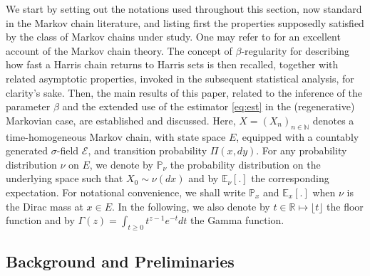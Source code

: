 \documentclass[sn-mathphys-ay]{sn-jnl}%
\begin{document}
We start by setting out the notations used throughout this section, now standard in the
Markov chain literature, and listing first the properties supposedly satisfied by the
class of Markov chains under study. One may refer to \cite{Meyn2009} for an excellent
account of the Markov chain theory. The concept of \(\beta\)-regularity for describing
how fast a Harris chain returns to Harris sets is then recalled, together with related
asymptotic properties, invoked in the subsequent statistical analysis, for clarity's
sake. Then, the main results of this paper, related to the inference of the parameter
$\beta$ and the extended use of the estimator \eqref{eq:est} in the (regenerative)
Markovian case, are established and discussed. Here, $X=(X_n)_{n\in \mathbb{N}}$ denotes
a time-homogeneous Markov chain, with state space $E$, equipped with a countably
generated $\sigma$-field $\mathcal{E}$, and transition probability $\Pi(x,dy)$. For any
probability distribution $\nu$ on $E$, we denote by $\mathbb{P}_{\nu}$ the probability
distribution on the underlying space such that $X_{0}\sim \nu(dx)$ and by
$\mathbb{E}_{\nu}[.]$ the corresponding expectation. For notational convenience, we shall
write $\mathbb{P}_{x}$ and $\mathbb{E}_{x}[.]$ when $\nu$ is the Dirac mass at $x\in E$.
In the following, we also denote by $t\in \mathbb{R}\mapsto \lfloor t \rfloor$ the floor
function and by $\Gamma(z)=\int_{t\geq 0}t^{z-1}e^{-t}dt$ the Gamma function.

\subsection{Background and Preliminaries}\label{subsec:back}
\end{document}
